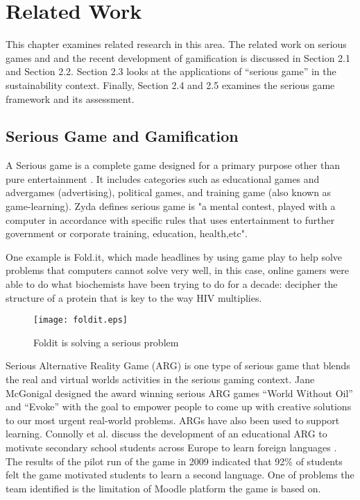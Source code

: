 \chapter{Related Work}
\label{cha:related-work}

This chapter examines related research in this area. The related work on serious games and and the recent development of gamification is discussed in Section 2.1 and Section 2.2. Section 2.3 looks at the applications of ``serious game'' in the sustainability context. Finally, Section 2.4 and 2.5 examines the serious game framework and its assessment.

\section {Serious Game and Gamification}
A Serious game is a complete game designed for a primary purpose other than pure entertainment \cite {WikipediaSeriousGame}. It includes categories such as educational games and advergames (advertising), political games, and training game (also known as game-learning). Zyda \cite{Zyda2005} defines serious game is "a mental contest, played with a computer in accordance with specific rules that uses entertainment to further government or corporate training, education, health,etc".

One example is Fold.it, which made headlines \cite {khatib2011crystal} by using game play to help solve problems that computers cannot solve very well, in this case, online gamers were able to do what biochemists have been trying to do for a decade: decipher the structure of a protein that is key to the way HIV multiplies.

\begin{figure}[htbp]
	\centering
		\texttt{[image: foldit.eps]}
		\caption{Foldit is solving a serious problem}
		\label{fig:foldit}
\end{figure}

Serious Alternative Reality Game (ARG) is one type of serious game that blends the real and virtual worlds activities in the serious gaming context.
Jane McGonigal designed the award winning serious ARG games 
``World Without Oil'' \cite{worldwithoutoil} and ``Evoke''
\cite{urgentevoke} with the goal to empower people to come up with creative
solutions to our most urgent real-world problems. ARGs have also been used to
support learning. Connolly et al. discuss the development of an educational ARG
to motivate secondary school students across Europe to learn foreign languages
\cite{connolly2009arguing}. The results of the pilot run of the game in 2009
indicated that 92\% of students felt the game motivated students to learn a
second language. One of problems the team identified is the limitation of
Moodle platform the game is based on.

